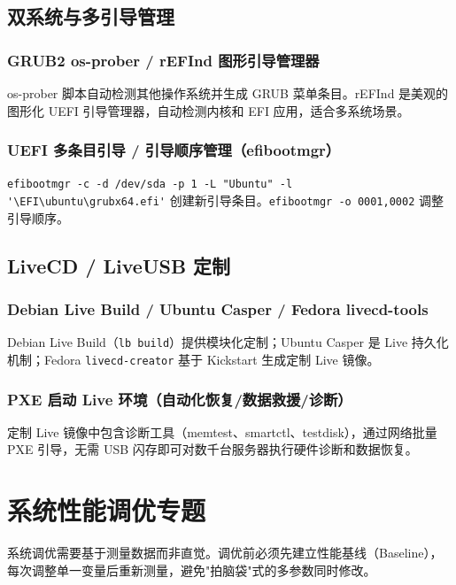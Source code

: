 \documentclass[12pt,UTF8]{ctexbook}
\begin{document}
  \section{双系统与多引导管理}
    \subsection{GRUB2 os-prober / rEFInd 图形引导管理器}

os-prober 脚本自动检测其他操作系统并生成 GRUB 菜单条目。rEFInd 是美观的图形化 UEFI 引导管理器，自动检测内核和 EFI 应用，适合多系统场景。

    \subsection{UEFI 多条目引导 / 引导顺序管理（efibootmgr）}

\verb|efibootmgr -c -d /dev/sda -p 1 -L "Ubuntu" -l '\EFI\ubuntu\grubx64.efi'| 创建新引导条目。\verb|efibootmgr -o 0001,0002| 调整引导顺序。

  \section{LiveCD / LiveUSB 定制}
    \subsection{Debian Live Build / Ubuntu Casper / Fedora livecd-tools}

Debian Live Build（\verb|lb build|）提供模块化定制；Ubuntu Casper 是 Live 持久化机制；Fedora \verb|livecd-creator| 基于 Kickstart 生成定制 Live 镜像。

    \subsection{PXE 启动 Live 环境（自动化恢复/数据救援/诊断）}

定制 Live 镜像中包含诊断工具（memtest、smartctl、testdisk），通过网络批量 PXE 引导，无需 USB 闪存即可对数千台服务器执行硬件诊断和数据恢复。


\chapter{系统性能调优专题}
\label{chap:system-perf-tuning}

系统调优需要基于测量数据而非直觉。调优前必须先建立性能基线（Baseline），每次调整单一变量后重新测量，避免"拍脑袋"式的多参数同时修改。
\end{document}
